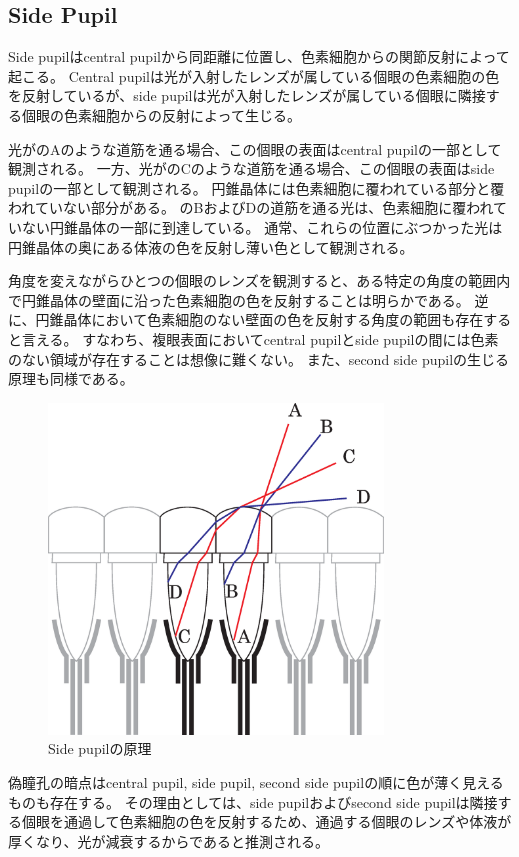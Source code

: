 \subsection{Side Pupil}
\label{SSSidePupil}

Side pupilはcentral pupilから同距離に位置し、色素細胞からの関節反射によって起こる。
Central pupilは光が入射したレンズが属している個眼の色素細胞の色を反射しているが、side pupilは光が入射したレンズが属している個眼に隣接する個眼の色素細胞からの反射によって生じる\cite{}。

光がのAのような道筋を通る場合、この個眼の表面はcentral pupilの一部として観測される。
一方、光がのCのような道筋を通る場合、この個眼の表面はside pupilの一部として観測される。
円錐晶体には色素細胞に覆われている部分と覆われていない部分がある。
のBおよびDの道筋を通る光は、色素細胞に覆われていない円錐晶体の一部に到達している。
通常、これらの位置にぶつかった光は円錐晶体の奥にある体液の色を反射し薄い色として観測される。

角度を変えながらひとつの個眼のレンズを観測すると、ある特定の角度の範囲内で円錐晶体の壁面に沿った色素細胞の色を反射することは明らかである。
逆に、円錐晶体において色素細胞のない壁面の色を反射する角度の範囲も存在すると言える。
すなわち、複眼表面においてcentral pupilとside pupilの間には色素のない領域が存在することは想像に難くない。
また、second side pupilの生じる原理も同様である。

\begin{figure}[htn]
  \centering
  \includegraphics[width=3.5in]{./img/sidepupil_exp}
  \caption{Side pupilの原理}
  \label{FSidepupilexplanation}
\end{figure}

偽瞳孔の暗点はcentral pupil, side pupil, second side pupilの順に色が薄く見えるものも存在する。
その理由としては、side pupilおよびsecond side pupilは隣接する個眼を通過して色素細胞の色を反射するため、通過する個眼のレンズや体液が厚くなり、光が減衰するからであると推測される。

